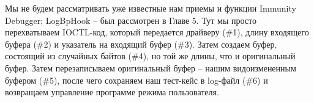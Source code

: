 \documentclass[12pt]{book}
\begin{document}
        
        
        












Мы не будем рассматривать уже известные нам приемы и функции Immunity Debugger; LogBpHook – был рассмотрен в Главе 5. Тут мы просто перехватываем IOCTL-код, который передается драйверу (\#1), длину входящего буфера (\#2) и указатель на входящий буфер (\#3). Затем создаем буфер, состоящий из случайных байтов (\#4), но той же длины, что и оригинальный буфер. Затем перезаписываем оригинальный буфер – нашим видоизмененным буфером (\#5), после чего сохраняем наш тест-кейс в log-файл (\#6) и возвращаем управление программе режима пользователя. 
\end{document}
